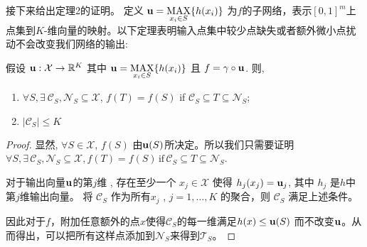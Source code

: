 接下来给出定理2的证明。
定义 $\mathbf u=\underset{x_i\in S}{\mbox{MAX}}\{h(x_i)\}$ 为$f$的子网络，表示$[0,1]^m$上点集到$K$-维向量的映射。以下定理表明输入点集中较少点缺失或者额外微小点扰动不会改变我们网络的输出:
\begin{customthm}{2}
假设 $\mathbf u:\mathcal{X}\rightarrow \mathbb{R}^K$ 其中 $\mathbf u=\underset{x_i\in S}{\mbox{MAX}}\{h(x_i)\}$ 且 $f=\gamma \circ \mathbf u$. 则, 
\begin{enumerate}[label=(\alph*)]   
    \item $\forall S, \exists~\mathcal{C}_S, \mathcal{N}_S\subseteq \mathcal{X}$,  $f(T)=f(S)$ if  $\mathcal{C}_S\subseteq T\subseteq \mathcal{N}_S$;
    \item $|\mathcal{C}_S| \le K$
\end{enumerate}
\end{customthm}
\begin{proof}
显然, $\forall S\in \mathcal{X}$, $f(S)$ 由$\mathbf u(S)$所决定。所以我们只需要证明 
$\forall S, \exists\,\mathcal{C}_S, \mathcal{N}_S\subseteq \mathcal{X}, f(T)=f(S)\,\mbox{if}\,\mathcal{C}_S\subseteq T\subseteq \mathcal{N}_S$. 

对于输出向量$\mathbf u$的第$j$维 , 存在至少一个 $x_j \in \mathcal{X}$ 使得 $h_j(x_j)=\mathbf u_j$, 其中 $h_j$ 是$h$中第$j$维输出向量。 将 $\mathcal{C}_S$ 作为所有$x_j$ , $j=1,\ldots,K$ 的聚合，则 $\mathcal{C}_S$ 满足上述条件。

因此对于$f$，附加任意额外的点$x$使得$\mathcal{C}_S$的每一维满足$h(x)\le \mathbf u(S)$ 而不改变$\mathbf u$。从而得出，可以把所有这样点添加到$\mathcal{N}_S$来得到$\mathcal{T}_S$。




\end{proof}